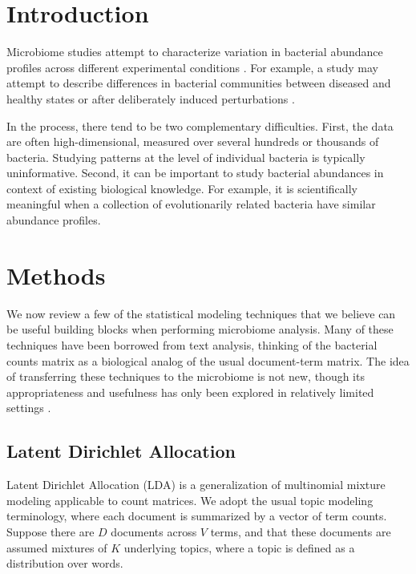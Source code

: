 \documentclass[oupdraft]{bio}
\begin{document}
\section{Introduction}

Microbiome studies attempt to characterize variation in bacterial abundance
profiles across different experimental conditions \citep{human2012structure}.
For example, a study may attempt to describe differences in bacterial
communities between diseased and healthy states or after deliberately induced
perturbations \citep{dethlefsen2011incomplete}.

In the process, there tend to be two complementary difficulties. First, the data
are often high-dimensional, measured over several hundreds or thousands of
bacteria. Studying patterns at the level of individual bacteria is typically
uninformative. Second, it can be important to study bacterial abundances in context
of existing biological knowledge. For example, it is scientifically meaningful
when a collection of evolutionarily related bacteria have similar abundance
profiles.

\section{Methods}

We now review a few of the statistical modeling techniques that we believe can
be useful building blocks when performing microbiome analysis. Many of these
techniques have been borrowed from text analysis, thinking of the bacterial
counts matrix as a biological analog of the usual document-term matrix. The idea
of transferring these techniques to the microbiome is not new, though its
appropriateness and usefulness has only been explored in relatively limited
settings \citep{shafiei2015biomico, chen2012estimating, holmes2012dirichlet,
  chen2013variable}.

\subsection{Latent Dirichlet Allocation}

Latent Dirichlet Allocation (LDA) is a generalization of multinomial mixture
modeling applicable to count matrices. We adopt the usual topic modeling
terminology, where each document is summarized by a vector of term counts.
Suppose there are $D$ documents across $V$ terms, and that these documents are
assumed mixtures of $K$ underlying topics, where a topic is defined as a
distribution over words.
\end{document}
